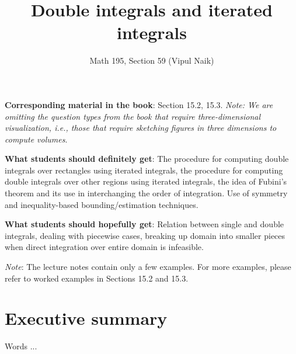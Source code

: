 \documentclass[10pt]{amsart}
\title{Double integrals and iterated integrals}
\author{Math 195, Section 59 (Vipul Naik)}
\begin{document}
\maketitle

{\bf Corresponding material in the book}: Section 15.2, 15.3. {\em
Note: We are omitting the question types from the book that require
three-dimensional visualization, i.e., those that require sketching
figures in three dimensions to compute volumes}.

{\bf What students should definitely get}: The procedure for computing
double integrals over rectangles using iterated integrals, the
procedure for computing double integrals over other regions using
iterated integrals, the idea of Fubini's theorem and its use in
interchanging the order of integration. Use of symmetry and
inequality-based bounding/estimation techniques.

{\bf What students should hopefully get}: Relation between single and
double integrals, dealing with piecewise cases, breaking up domain
into smaller pieces when direct integration over entire domain is
infeasible.

{\em Note}: The lecture notes contain only a few examples. For more
examples, please refer to worked examples in Sections 15.2 and 15.3.

\section*{Executive summary}

Words ...
\end{document}
